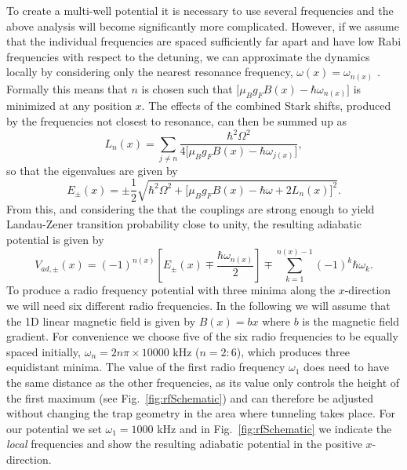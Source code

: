 To create a multi-well potential it is necessary to use several
frequencies and the above analysis will become significantly more
complicated. However, if we assume that the individual frequencies are
spaced sufficiently far apart and have low Rabi frequencies with
respect to the detuning, we can approximate the dynamics locally by
considering only the nearest resonance frequency,
$\omega(x)=\omega_{n(x)}$ \cite{Courteille:06}. Formally this means
that $n$ is chosen such that $\lbrack \mu_B g_F B(x) - \hbar
\omega_{n(x)} \rbrack$ is minimized at any position $x$. The effects
of the combined Stark shifts, produced by the frequencies not closest
to resonance, can then be summed up as \cite{Courteille:06}
\begin{equation}
  L_n(x)=\sum_{j\not=n} \frac{\hbar^2 \Omega^2}
         {4 \lbrack \mu_B g_F B(x) - \hbar \omega_{j(x)} \rbrack},
\end{equation}
so that the eigenvalues are given by
\begin{equation}
  E_{\pm}(x) =\pm\frac{1}{2}\sqrt{ \hbar^2 \Omega^2 + \lbrack \mu_B g_F B(x) 
              - \hbar \omega +2 L_n(x) \rbrack^2}.
\end{equation}
From this, and considering the that the couplings are strong enough to
yield Landau-Zener transition probability close to unity, the
resulting adiabatic potential is given by
\begin{equation}
  V_{ad,\pm}(x)=(-1)^{n(x)} \left[ E_\pm(x) \mp \frac{\hbar \omega_{n(x)}}{2} \right] 
               \mp \sum^{n(x)-1}_{k=1}(-1)^k \hbar \omega_k.
\end{equation}
To produce a radio frequency potential with three minima along the
$x$-direction we will need six different radio frequencies. In the
following we will assume that the 1D linear magnetic field is given by
$B(x)=bx$ where $b$ is the magnetic field gradient. For convenience we
choose five of the six radio frequencies to be equally spaced
initially, $\omega_n=2n\pi \times 10000$ kHz ($n=2:6$), which produces
three equidistant minima.  The value of the first radio frequency
$\omega_1$ does need to have the same distance as the other
frequencies, as its value only controls the height of the first
maximum (see Fig.~\ref{fig:rfSchematic}) and can therefore be adjusted
without changing the trap geometry in the area where tunneling takes
place. For our potential we set $\omega_1=1000$ kHz and in
Fig.~\ref{fig:rfSchematic} we indicate the {\sl local} frequencies and
show the resulting adiabatic potential in the positive $x$-direction.

